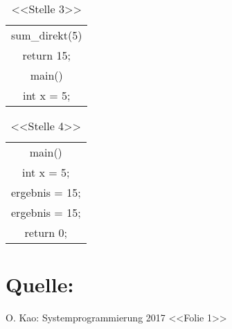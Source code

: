 \documentclass[a4paper,12pt]{article}
\begin{document}
\vspace{\baselineskip}
\vspace{\baselineskip}
\vspace{\baselineskip}
\begin{table}
	\begin{center}
		\begin{tabular}{|c|}
			\\ 
			\hline sum\_direkt(5) \\ return 15;\\
			\hline main() \\ int x = 5;	\\ 
			\hline 
		\end{tabular}
	\end{center}
	\caption*{<<Stelle 3>>}
\end{table}

\vspace{\baselineskip}

\begin{table}
	\begin{center}
		\begin{tabular}{|c|}
			\\ 
			\hline main() \\ int x = 5; \\ ergebnis = 15; \\ ergebnis = 15; \\ return 0;\\
			\hline 
		\end{tabular}
	\end{center}
	\caption*{<<Stelle 4>>}
\end{table}

\clearpage
\section*{Quelle:}

O. Kao: Systemprogrammierung 2017 <<Folie 1>>
  
 
 
 
\end{document}
